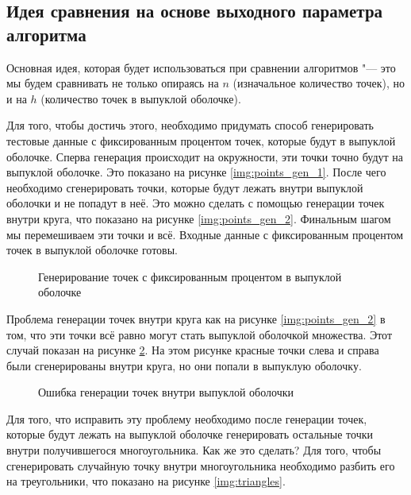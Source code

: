 \subsection{Идея сравнения на основе выходного параметра алгоритма}

Основная идея, которая будет использоваться при сравнении алгоритмов "--- это мы будем сравнивать не только опираясь на $n$ (изначальное количество точек), но и на $h$ (количество точек в выпуклой оболочке).

Для того, чтобы достичь этого, необходимо придумать способ генерировать тестовые данные с фиксированным процентом точек, которые будут в выпуклой оболочке. Сперва генерация происходит на окружности, эти точки точно будут на выпуклой оболочке. Это показано на рисунке \ref{img:points_gen_1}. После чего необходимо сгенерировать точки, которые будут лежать внутри выпуклой оболочки и не попадут в неё. Это можно сделать с помощью генерации точек внутри круга, что показано на рисунке \ref{img:points_gen_2}. Финальным шагом мы перемешиваем эти точки и всё. Входные данные с фиксированным процентом точек в выпуклой оболочке готовы.

\begin{figure}
	{\centering
		\hfill
		\subbottom[\label{img:points_gen_1}]{%
			}
		\hfill
		\subbottom[\label{img:points_gen_2}]{%
			}
		\hfill
	}
	\caption{Генерирование точек с фиксированным процентом в выпуклой оболочке}
	\label{img:points_gen}
\end{figure}

Проблема генерации точек внутри круга как на рисунке \ref{img:points_gen_2} в том, что эти точки всё равно могут стать выпуклой оболочкой множества. Этот случай показан на рисунке \ref{img:gen_error}. На этом рисунке красные точки слева и справа были сгенерированы внутри круга, но они попали в выпуклую оболочку.

\begin{figure}
	\centering
	
	\caption{Ошибка генерации точек внутри выпуклой оболочки}
	\label{img:gen_error}
\end{figure}

Для того, что исправить эту проблему необходимо после генерации точек, которые будут лежать на выпуклой оболочке генерировать остальные точки внутри получившегося многоугольника. Как же это сделать? Для того, чтобы сгенерировать случайную точку внутри многоугольника необходимо разбить его на треугольники, что показано на рисунке \ref{img:triangles}.

